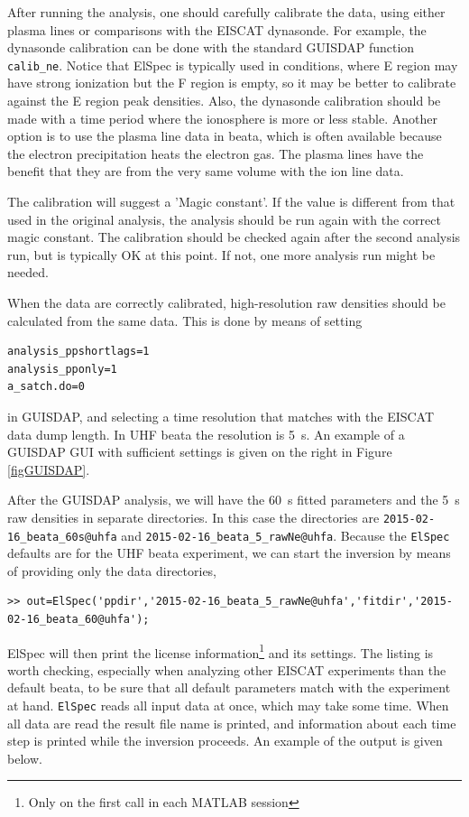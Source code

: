 \documentclass[12pt,a4paper]{report}
\begin{document}
After running the analysis, one should carefully calibrate the data, using either plasma lines or comparisons with the EISCAT dynasonde. For example, the dynasonde calibration can be done with the standard GUISDAP function \verb|calib_ne|. Notice that ElSpec is typically used in conditions, where E region may have strong ionization but the F region is empty, so it may be better to calibrate against the E region peak densities. Also, the dynasonde calibration should be made with a time period where the ionosphere is more or less stable. Another option is to use the plasma line data in beata, which is often available because the electron precipitation heats the electron gas. The plasma lines have the benefit that they are from the very same volume with the ion line data. 

The calibration will suggest a 'Magic constant'. If the value is different from that used in the original analysis, the analysis should be run again with the correct magic constant. The calibration should be checked again after the second analysis run, but is typically OK at this point. If not, one more analysis run might be needed. 

When the data are correctly calibrated, high-resolution raw densities should be calculated from the same data. This is done by means of setting 
\begin{verbatim}
analysis_ppshortlags=1
analysis_pponly=1
a_satch.do=0
\end{verbatim}
in GUISDAP, and selecting a time resolution that matches with the EISCAT data dump length. In UHF beata the resolution is 5~s. An example of a GUISDAP GUI with sufficient settings is given on the right in Figure \ref{figGUISDAP}.

After the GUISDAP analysis, we will have the 60~s fitted parameters and the 5~s raw densities in separate directories. In this case the directories are \verb|2015-02-16_beata_60s@uhfa| and \verb|2015-02-16_beata_5_rawNe@uhfa|. Because the \verb|ElSpec| defaults are for the UHF beata experiment, we can start the inversion by means of providing only the data directories,


\begin{lstlisting}[style=myMATLAB]
>> out=ElSpec('ppdir','2015-02-16_beata_5_rawNe@uhfa','fitdir','2015-02-16_beata_60@uhfa');
\end{lstlisting}

ElSpec will then print the license information\footnote{Only on the first call in each MATLAB session} and its settings. The listing is worth checking, especially when analyzing other EISCAT experiments than the default beata, to be sure that all default parameters match with the experiment at hand. \verb|ElSpec| reads all input data at once, which may take some time. When all data are read the result file name is printed, and information about each time step is printed while the inversion proceeds. An example of the output is given below. 
\end{document}
